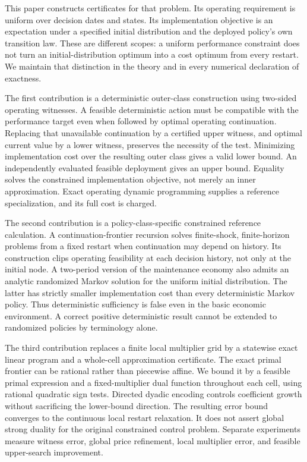 This paper constructs certificates for that problem. Its operating requirement is uniform over decision dates and states. Its implementation objective is an expectation under a specified initial distribution and the deployed policy's own transition law. These are different scopes: a uniform performance constraint does not turn an initial-distribution optimum into a cost optimum from every restart. We maintain that distinction in the theory and in every numerical declaration of exactness.

The first contribution is a deterministic outer-class construction using two-sided operating witnesses. A feasible deterministic action must be compatible with the performance target even when followed by optimal operating continuation. Replacing that unavailable continuation by a certified upper witness, and optimal current value by a lower witness, preserves the necessity of the test. Minimizing implementation cost over the resulting outer class gives a valid lower bound. An independently evaluated feasible deployment gives an upper bound. Equality solves the constrained implementation objective, not merely an inner approximation. Exact operating dynamic programming supplies a reference specialization, and its full cost is charged.

The second contribution is a policy-class-specific constrained reference calculation. A continuation-frontier recursion solves finite-shock, finite-horizon problems from a fixed restart when continuation may depend on history. Its construction clips operating feasibility at each decision history, not only at the initial node. A two-period version of the maintenance economy also admits an analytic randomized Markov solution for the uniform initial distribution. The latter has strictly smaller implementation cost than every deterministic Markov policy. Thus deterministic sufficiency is false even in the basic economic environment. A correct positive deterministic result cannot be extended to randomized policies by terminology alone.

The third contribution replaces a finite local multiplier grid by a statewise exact linear program and a whole-cell approximation certificate. The exact primal frontier can be rational rather than piecewise affine. We bound it by a feasible primal expression and a fixed-multiplier dual function throughout each cell, using rational quadratic sign tests. Directed dyadic encoding controls coefficient growth without sacrificing the lower-bound direction. The resulting error bound converges to the continuous local restart relaxation. It does not assert global strong duality for the original constrained control problem. Separate experiments measure witness error, global price refinement, local multiplier error, and feasible upper-search improvement.

